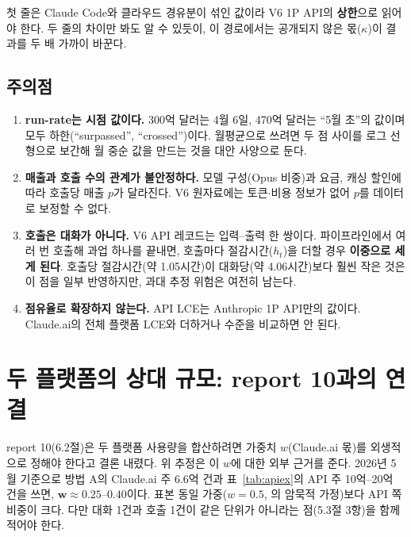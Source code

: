 \documentclass[11pt]{article}
\begin{document}
첫 줄은 Claude Code와 클라우드 경유분이 섞인 값이라 V6 1P API의 \textbf{상한}으로 읽어야 한다. 두 줄의 차이만 봐도 알 수 있듯이, 이 경로에서는 공개되지 않은 몫($\kappa$)이 결과를 두 배 가까이 바꾼다.

\subsection{주의점}

\begin{enumerate}[label=(\arabic*)]
  \item \textbf{run-rate는 시점 값이다.} 300억 달러는 4월 6일, 470억 달러는 ``5월 초''의 값이며 모두 하한(``surpassed'', ``crossed'')이다. 월평균으로 쓰려면 두 점 사이를 로그 선형으로 보간해 월 중순 값을 만드는 것을 대안 사양으로 둔다.
  \item \textbf{매출과 호출 수의 관계가 불안정하다.} 모델 구성(Opus 비중)과 요금, 캐싱 할인에 따라 호출당 매출 $p$가 달라진다. V6 원자료에는 토큰$\cdot$비용 정보가 없어 $p$를 데이터로 보정할 수 없다.
  \item \textbf{호출은 대화가 아니다.} V6 API 레코드는 입력--출력 한 쌍이다. 파이프라인에서 여러 번 호출해 과업 하나를 끝내면, 호출마다 절감시간($h_t$)을 더할 경우 \textbf{이중으로 세게 된다}. 호출당 절감시간(약 1.05시간)이 대화당(약 4.06시간)보다 훨씬 작은 것은 이 점을 일부 반영하지만, 과대 추정 위험은 여전히 남는다.
  \item \textbf{점유율로 확장하지 않는다.} API LCE는 Anthropic 1P API만의 값이다. Claude.ai의 전체 플랫폼 LCE와 더하거나 수준을 비교하면 안 된다.
\end{enumerate}

\section{두 플랫폼의 상대 규모: report 10과의 연결}

report 10(6.2절)은 두 플랫폼 사용량을 합산하려면 가중치 $w$(Claude.ai 몫)를 외생적으로 정해야 한다고 결론 내렸다. 위 추정은 이 $w$에 대한 외부 근거를 준다. 2026년 5월 기준으로 방법 A의 Claude.ai 주 6.6억 건과 표~\ref{tab:apiex}의 API 주 10억--20억 건을 쓰면, $\boldsymbol{w\approx 0.25\text{--}0.40}$이다. 표본 동일 가중($w=0.5$, \textcite{massenkoff-2026-labor-market-impacts-of-ai}의 암묵적 가정)보다 API 쪽 비중이 크다. 다만 대화 1건과 호출 1건이 같은 단위가 아니라는 점(5.3절 3항)을 함께 적어야 한다.
\end{document}

